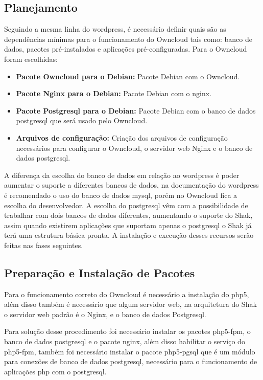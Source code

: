 \subsection{Planejamento}

Seguindo a mesma linha do wordpress, é necessário definir quais são as dependências
mínimas para o funcionamento do Owncloud tais como: banco de dados, pacotes
pré-instalados e aplicações pré-configuradas. Para o Owncloud foram escolhidas:

\begin{itemize}
   \item \textbf{Pacote Owncloud para o Debian:} Pacote Debian com o Owncloud.
   \item \textbf{Pacote Nginx para o Debian:} Pacote Debian com o nginx.
   \item \textbf{Pacote Postgresql para o Debian:} Pacote Debian com o banco de dados postgresql
   que será usado pelo Owncloud.
   \item \textbf{Arquivos de configuração:} Criação dos arquivos de configuração
   necessários para configurar o Owncloud, o servidor web Nginx e o banco de dados
   postgresql.
\end{itemize}

A diferença da escolha do banco de dados em relação ao wordpress é poder aumentar
o suporte a diferentes bancos de dados, na documentação do wordpress é recomendado
o uso do banco de dados mysql, porém no Owncloud fica a escolha do desenvolvedor.
A escolha do postgresql vêm com a possibilidade de trabalhar com dois bancos de
dados diferentes, aumentando o suporte do Shak, assim quando existirem aplicações
que suportam apenas o postgresql o Shak já terá uma estrutura básica pronta.
A instalação e execução desses recursos serão feitas nas fases seguintes.

\subsection{Preparação e Instalação de Pacotes}

Para o funcionamento correto do Owncloud é necessário a instalação do php5, além
disso também é necessário que algum servidor web, na arquitetura do Shak o servidor
web padrão é o Nginx, e o banco de dados Postgresql.

Para solução desse procedimento foi necessário instalar os pacotes php5-fpm, o banco
de dados postgresql e o pacote nginx, além disso habilitar o serviço do php5-fpm,
também foi necessário instalar o pacote php5-pgsql que é um módulo para
conexões de banco de dados postgresql, necessário para o funcionamento de
aplicações php com o postgresql.

